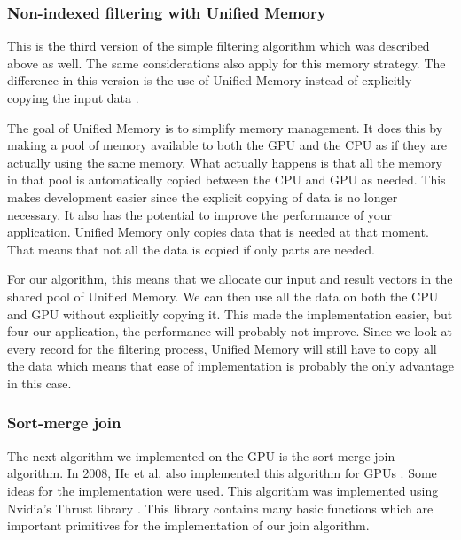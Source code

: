 \documentclass[a4paper,titlepage]{article}
\begin{document}
\subsubsection{Non-indexed filtering with Unified Memory}
This is the third version of the simple filtering algorithm which was described above as well. The same considerations also apply for this memory strategy. The difference in this version is the use of Unified Memory instead of explicitly copying the input data \cite{harris2013}.

The goal of Unified Memory is to simplify memory management. It does this by making a pool of memory available to both the GPU and the CPU as if they are actually using the same memory. What actually happens is that all the memory in that pool is automatically copied between the CPU and GPU as needed. This makes development easier since the explicit copying of data is no longer necessary. It also has the potential to improve the performance of your application. Unified Memory only copies data that is needed at that moment. That means that not all the data is copied if only parts are needed.

For our algorithm, this means that we allocate our input and result vectors in the shared pool of Unified Memory. We can then use all the data on both the CPU and GPU without explicitly copying it. This made the implementation easier, but four our application, the performance will probably not improve. Since we look at every record for the filtering process, Unified Memory will still have to copy all the data which means that ease of implementation is probably the only advantage in this case.

\subsubsection{Sort-merge join}
The next algorithm we implemented on the GPU is the sort-merge join algorithm. In 2008, He et al. also implemented this algorithm for GPUs \cite{he2008}. Some ideas for the implementation were used. This algorithm was implemented using Nvidia's Thrust library \cite{thrust}. This library contains many basic functions which are important primitives for the implementation of our join algorithm. 
\end{document}
